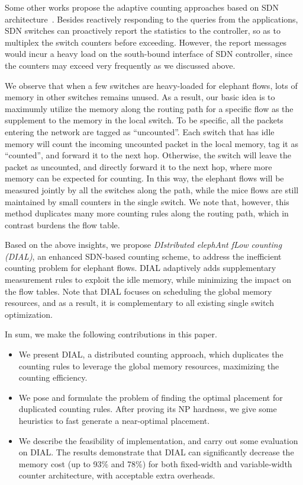 Some other works propose the adaptive counting approaches based on SDN architecture~\cite{Zhang2013, Hu2015, Jarschel2013, Adrichem2014, Suh2014}. 
Besides reactively responding to the queries from the applications, SDN switches can proactively report the statistics to the controller, so as to multiplex the switch counters before exceeding.
However, the report messages would incur a heavy load on the south-bound interface of SDN controller, since the counters may exceed very frequently as we discussed above.

We observe that when a few switches are heavy-loaded for elephant flows, lots of memory in other switches remains unused.
As a result, our basic idea is to maximumly utilize the memory along the routing path for a specific flow as the supplement to the memory in the local switch.
To be specific, all the packets entering the network are tagged as ``uncounted''.
Each switch that has idle memory will count the incoming uncounted packet in the local memory, tag it as ``counted'', and forward it to the next hop.
Otherwise, the switch will leave the packet as uncounted, and directly forward it to the next hop, where more memory can be expected for counting.
In this way, the elephant flows will be measured jointly by all the switches along the path, while the mice flows are still maintained by small counters in the single switch.
We note that, however, this method duplicates many more counting rules along the routing path, which in contrast burdens the flow table.

Based on the above insights, we propose \emph{DIstributed elephAnt fLow counting (DIAL)}, an enhanced SDN-based counting scheme, to address the inefficient counting problem for elephant flows.
DIAL adaptively adds supplementary measurement rules to exploit the idle memory, while minimizing the impact on the flow tables.
Note that DIAL focuses on scheduling the global memory resources, and as a result, it is complementary to all existing single switch optimization.

In sum, we make the following contributions in this paper.

\begin{itemize}
\item We present DIAL, a distributed counting approach, which duplicates the counting rules to leverage the global memory resources, maximizing the counting efficiency.
\item We pose and formulate the problem of finding the optimal placement for duplicated counting rules. After proving its NP hardness, we give some heuristics to fast generate a near-optimal placement.
\item We describe the feasibility of implementation, and carry out some evaluation on DIAL. The results demonstrate that DIAL can significantly decrease the memory cost (up to 93\% and 78\%) for both fixed-width and variable-width counter architecture, with acceptable extra overheads.
\end{itemize}